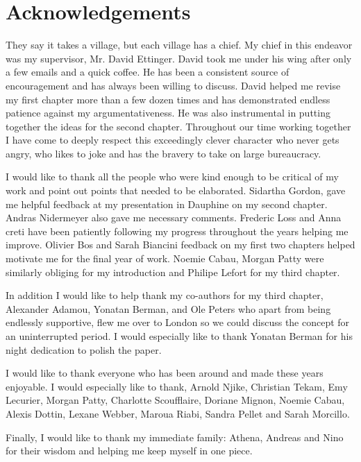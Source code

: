\documentclass[12pt,twoside]{report}
\makeatletter
\numberwithin{equation}{section}
\newcommand{\chapterauthor}[1]{%
  {\parindent0pt\vspace*{-25pt}%
  \linespread{1.1}\large\scshape#1%
  \par\nobreak\vspace*{35pt}}
  \@afterheading%
}
\makeatother
\begin{document}
 
\chapter*{Acknowledgements}
They say it takes a village, but each village has a chief. My chief in this endeavor was my supervisor, Mr. David Ettinger. David took me under his wing after only a few emails and a quick coffee. He has been a consistent source of encouragement and has always been willing to discuss. David helped me revise my first chapter more than a few dozen times and has demonstrated endless patience against my argumentativeness. He was also instrumental in putting together the ideas for the second chapter. Throughout our time working together I have come to deeply respect this exceedingly clever character who never gets angry, who likes to joke and has the bravery to take on large bureaucracy.

I would like to thank all the people who were kind enough to be critical of my work and point out points that needed to be elaborated. Sidartha Gordon, gave me helpful feedback at my presentation in Dauphine on my second chapter. Andras Nidermeyer also gave me necessary comments. Frederic Loss and Anna creti have been patiently following my progress throughout the years helping me improve. Olivier Bos and Sarah Biancini feedback on my first two chapters helped motivate me for the final year of work. Noemie Cabau, Morgan Patty were similarly obliging for my introduction and Philipe Lefort for my third chapter. 

In addition I would like to help thank my co-authors for my third chapter, Alexander Adamou, Yonatan Berman, and Ole Peters who apart from being endlessly supportive, flew me over to London so we could discuss the concept for an uninterrupted period. I would especially like to thank Yonatan Berman for his night dedication to polish the paper.

I would like to thank everyone who has been around and made these years enjoyable. I would especially like to thank, Arnold Njike, Christian Tekam, Emy Lecurier, Morgan Patty, Charlotte Scoufflaire, Doriane Mignon, Noemie Cabau, Alexis Dottin, Lexane Webber, Maroua Riabi, Sandra Pellet and Sarah Morcillo. 

Finally, I would like to thank my immediate family: Athena, Andreas and Nino for their wisdom and helping me keep myself in one piece.
% 
\end{document}
